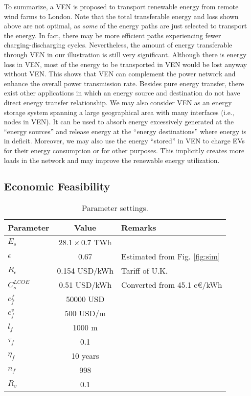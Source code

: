 \documentclass[journal]{IEEEtran}
\begin{document}
To summarize, a VEN is proposed to transport renewable energy from remote wind farms to London. Note that the total transferable energy and loss shown above are not optimal, as \textit{some} of the energy paths are just selected to transport the energy. In fact, there may be more efficient paths experiencing fewer charging-discharging cycles. Nevertheless, the amount of energy transferable through VEN in our illustration is still very significant. Although there is energy loss in VEN, most of the  energy to be transported in VEN would be lost anyway without VEN. 
This shows that VEN can complement the power network and enhance the overall power transmission rate.
Besides pure energy transfer, there exist other applications in which an energy source and destination do not have direct energy transfer relationship. We may also consider VEN as an energy storage system spanning a large geographical area with many interfaces (i.e., nodes in VEN). It can be used to absorb energy excessively generated at the ``energy sources'' and release energy at the ``energy destinations'' where energy is in deficit. Moreover, we may also use the energy ``stored'' in VEN to charge EVs for their energy consumption or for other purposes. This implicitly creates more loads in the network and may improve the renewable energy utilization.


\vspace{-0.3cm}
\subsection{Economic Feasibility}


\begin{table}[!t]
\renewcommand{\arraystretch}{1.3}
\caption{Parameter settings.}
\label{tab:parameters}
\centering
\scriptsize
\begin{tabular}{l|c|l}
\hline\hline
Parameter & Value & Remarks\\
\hline
$E_s$ 			&  $28.1\times 0.7$ TWh		& \cite{UKWind}  \\
$\epsilon$				&  0.67	 & Estimated from Fig. \ref{fig:sim} 	\\
$R_e$ 	&  0.154	USD/kWh	& Tariff of U.K. \cite{tariff}		\\
$C_{s}^{LCOE}$ 		& 0.51 USD/kWh & Converted from 45.1 c\euro/kWh \cite{storagecost}\\
$c_f^f$						& 50000 USD		& \cite{EconDCEV}\\
$c_f^v$						& 500 USD/m	& \cite{EconDCEV}\\
$l_f$					&  1000 m		\\
$\tau_f$			&	0.1		\\
$\eta_f$ 			&	 10	years	\\
$n_f$								& 998		\\
$R_v$								&  0.1	\\
\hline\hline
\end{tabular}
\vspace{-0.3cm}
\end{table}
\end{document}
